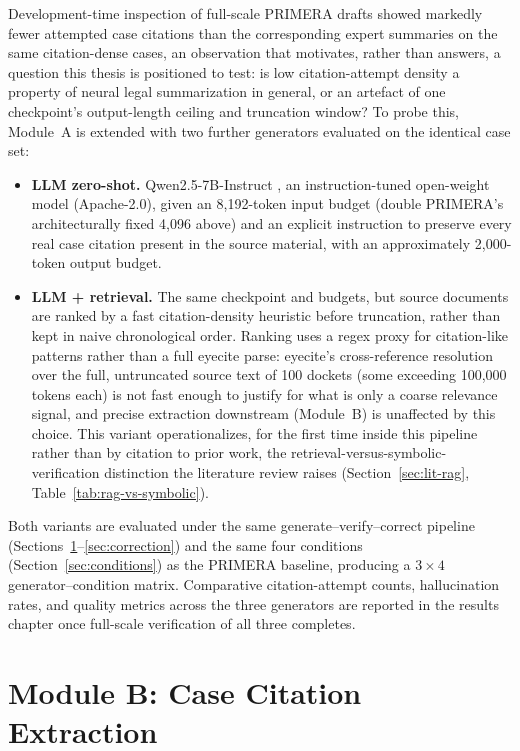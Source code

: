 Development-time inspection of full-scale PRIMERA drafts showed markedly fewer attempted case citations than the corresponding expert summaries on the same citation-dense cases, an observation that motivates, rather than answers, a question this thesis is positioned to test: is low citation-attempt density a property of neural legal summarization in general, or an artefact of one checkpoint's output-length ceiling and truncation window? To probe this, Module~A is extended with two further generators evaluated on the identical case set:

\begin{itemize}
  \item \textbf{LLM zero-shot.} Qwen2.5-7B-Instruct \cite{qwen2025qwen25,yang2024qwen2}, an instruction-tuned open-weight model (Apache-2.0), given an 8{,}192-token input budget (double PRIMERA's architecturally fixed 4{,}096 above) and an explicit instruction to preserve every real case citation present in the source material, with an approximately 2{,}000-token output budget.
  \item \textbf{LLM + retrieval.} The same checkpoint and budgets, but source documents are ranked by a fast citation-density heuristic before truncation, rather than kept in naive chronological order. Ranking uses a regex proxy for citation-like patterns rather than a full eyecite parse: eyecite's cross-reference resolution over the full, untruncated source text of 100 dockets (some exceeding 100{,}000 tokens each) is not fast enough to justify for what is only a coarse relevance signal, and precise extraction downstream (Module~B) is unaffected by this choice. This variant operationalizes, for the first time inside this pipeline rather than by citation to prior work, the retrieval-versus-symbolic-verification distinction the literature review raises (Section~\ref{sec:lit-rag}, Table~\ref{tab:rag-vs-symbolic}).
\end{itemize}

Both variants are evaluated under the same generate--verify--correct pipeline (Sections~\ref{sec:module-b}--\ref{sec:correction}) and the same four conditions (Section~\ref{sec:conditions}) as the PRIMERA baseline, producing a $3\times4$ generator--condition matrix. Comparative citation-attempt counts, hallucination rates, and quality metrics across the three generators are reported in the results chapter once full-scale verification of all three completes.

\section{Module B: Case Citation Extraction}
\label{sec:module-b}

